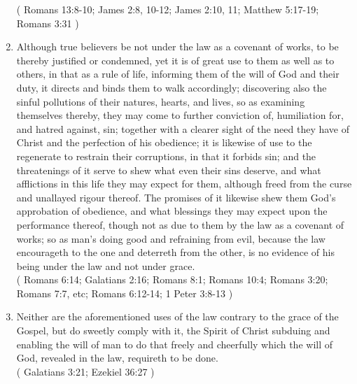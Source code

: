 \documentclass[12pt,a4paper]{book}
\begin{document}
\begin{enumerate}
( Romans 13:8-10; James 2:8, 10-12; James 2:10, 11; Matthew 5:17-19; Romans 3:31 )
\item
\label{ch-law-God-6}
Although true believers be not under the law as a covenant of works, to be thereby justified or condemned, yet it is of great use to them as well as to others, in that as a rule of life, informing them of the will of God and their duty, it directs and binds them to walk accordingly; discovering also the sinful pollutions of their natures, hearts, and lives, so as examining themselves thereby, they may come to further conviction of, humiliation for, and hatred against, sin; together with a clearer sight of the need they have of Christ and the perfection of his obedience; it is likewise of use to the regenerate to restrain their corruptions, in that it forbids sin; and the threatenings of it serve to shew what even their sins deserve, and what afflictions in this life they may expect for them, although freed from the curse and unallayed rigour thereof. The promises of it likewise shew them God's approbation of obedience, and what blessings they may expect upon the performance thereof, though not as due to them by the law as a covenant of works; so as man's doing good and refraining from evil, because the law encourageth to the one and deterreth from the other, is no evidence of his being under the law and not under grace.\\
( Romans 6:14; Galatians 2:16; Romans 8:1; Romans 10:4; Romans 3:20; Romans 7:7, etc; Romans 6:12-14; 1 Peter 3:8-13 )
\item
\label{ch-law-God-7}
Neither are the aforementioned uses of the law contrary to the grace of the Gospel, but do sweetly comply with it, the Spirit of Christ subduing and enabling the will of man to do that freely and cheerfully which the will of God, revealed in the law, requireth to be done.\\
( Galatians 3:21; Ezekiel 36:27 )
\end{enumerate}
\end{document}
